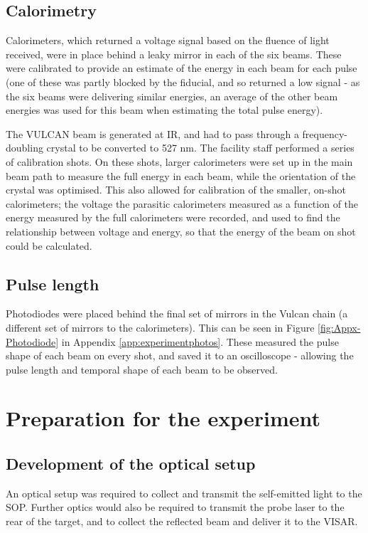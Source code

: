 \subsection{Calorimetry}
Calorimeters, which returned a voltage signal based on the fluence of light received, were in place behind a leaky mirror in each of the six beams. These were calibrated to provide an estimate of the energy in each beam for each pulse (one of these was partly blocked by the fiducial, and so returned a low signal - as the six beams were delivering similar energies, an average of the other beam energies was used for this beam when estimating the total pulse energy).

The VULCAN beam is generated at IR, and had to pass through a frequency-doubling crystal to be converted to 527 \unit{\nano\meter}. The facility staff performed a series of calibration shots. On these shots, larger calorimeters were set up in the main beam path to measure the full energy in each beam, while the orientation of the crystal was optimised. This also allowed for calibration of the smaller, on-shot calorimeters; the voltage the parasitic calorimeters measured as a function of the energy measured by the full calorimeters were recorded, and used to find the relationship between voltage and energy, so that the energy of the beam on shot could be calculated.

\subsection{Pulse length}
Photodiodes were placed behind the final set of mirrors in the Vulcan chain (a different set of mirrors to the calorimeters). This can be seen in Figure \ref{fig:Appx-Photodiode} in Appendix \ref{app:experimentphotos}. These measured the pulse shape of each beam on every shot, and saved it to an oscilloscope - allowing the pulse length and temporal shape of each beam to be observed.

\section{Preparation for the experiment}\label{sec:preparation-for-the-experiment}

\subsection{Development of the optical setup}

An optical setup was required to collect and transmit the self-emitted light to the SOP. Further optics would also be required to transmit the probe laser to the rear of the target, and to collect the reflected beam and deliver it to the VISAR. 

